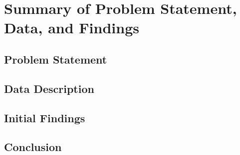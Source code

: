 \chapter{Summary of Problem Statement, Data, and Findings}
\label{cha:chapter 1}


\section{Problem Statement}
\label{sec:chap1 section 1}

\section{Data Description}
\label{sec:chap1 section 2}

\section{Initial Findings}
\label{sec:chap1 section 3}

\section{Conclusion}
\label{sec:chap1 section 4}
